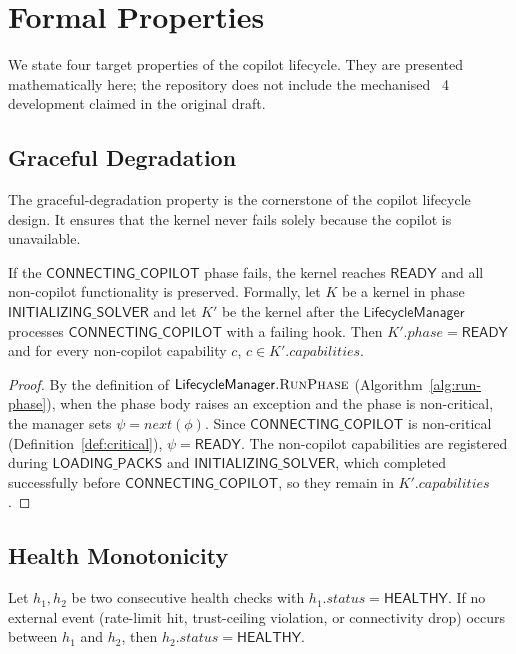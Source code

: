 \documentclass[11pt]{article}
\newcommand{\LM}{\mathsf{LifecycleManager}}
\newcommand{\LOADING}{\mathsf{LOADING\_PACKS}}
\newcommand{\INITSOLVER}{\mathsf{INITIALIZING\_SOLVER}}
\newcommand{\CONNECTING}{\mathsf{CONNECTING\_COPILOT}}
\newcommand{\READY}{\mathsf{READY}}
\begin{document}
\section{Formal Properties}\label{sec:formal}

We state four target properties of the copilot lifecycle.  They are
presented mathematically here; the repository does not include the
mechanised \LEAN~4 development claimed in the original draft.

\subsection{Graceful Degradation}

The graceful-degradation property is the cornerstone of the
copilot lifecycle design.  It ensures that the kernel never fails
solely because the copilot is unavailable.

\begin{theorem}\label{thm:degradation}
If the $\CONNECTING$ phase fails, the kernel reaches
$\READY$ and all non-copilot functionality is preserved.
Formally, let $K$ be a kernel in phase $\INITSOLVER$ and
let $K'$ be the kernel after the $\LM$ processes
$\CONNECTING$ with a failing hook.  Then
$K'.\mathit{phase} = \READY$ and for every non-copilot
capability $c$, $c \in K'.\mathit{capabilities}$.
\end{theorem}

\begin{proof}
By the definition of $\LM.\textsc{RunPhase}$
(Algorithm~\ref{alg:run-phase}), when the phase body raises an
exception and the phase is non-critical, the manager sets
$\psi = \mathit{next}(\phi)$.  Since $\CONNECTING$ is
non-critical (Definition~\ref{def:critical}), $\psi = \READY$.
The non-copilot capabilities are registered during $\LOADING$
and $\INITSOLVER$, which completed successfully before
$\CONNECTING$, so they remain in
$K'.\mathit{capabilities}$.
\end{proof}

\subsection{Health Monotonicity}

\begin{theorem}\label{thm:health-mono}
Let $h_1, h_2$ be two consecutive health checks with
$h_1.\mathit{status} = \mathsf{HEALTHY}$.  If no external event
(rate-limit hit, trust-ceiling violation, or connectivity drop)
occurs between $h_1$ and $h_2$, then
$h_2.\mathit{status} = \mathsf{HEALTHY}$.
\end{theorem}
\end{document}
